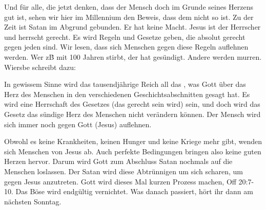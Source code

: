 \begin{otsblock}
        Und für alle, die jetzt denken, dass der Mensch doch im Grunde seines Herzens gut ist, sehen wir hier im Millennium den Beweis, dass dem nicht so ist. Zu der Zeit ist Satan im Abgrund gebunden. Er hat keine Macht. Jesus ist der Herrscher und herrscht gerecht. Es wird Regeln und Gesetze geben, die absolut gerecht gegen jeden sind. Wir lesen, dass sich Menschen gegen diese Regeln auflehnen werden. Wer z\.B mit 100 Jahren stirbt, der hat gesündigt. Andere werden murren. Wiersbe schreibt dazu:
        \begin{otsblock}
            In gewissem Sinne wird das tausendjährige Reich all das , was Gott über das Herz des Menschen in den verschiedenen Geschichtsabschnitten gesagt hat. Es wird eine Herrschaft des Gesetzes (das gerecht sein wird) sein, und doch wird das Gesetz das sündige Herz des Menschen nicht verändern können. Der Mensch wird sich immer noch gegen Gott (Jesus) auflehnen.
        \end{otsblock}        
        Obwohl es keine Krankheiten, keinen Hunger und keine Kriege mehr gibt, wenden sich Menschen von Jesus ab. Auch perfekte Bedingungen bringen also keine guten Herzen hervor. Darum wird Gott zum Abschluss Satan nochmals auf die Menschen loslassen. Der Satan wird diese Abtrünnigen um sich scharen, um gegen Jesus anzutreten. Gott wird dieses Mal kurzen Prozess machen, Off 20:7-10. Das Böse wird endgültig vernichtet. Was danach passiert, hört ihr dann am nächsten Sonntag.   
        
    \end{otsblock}